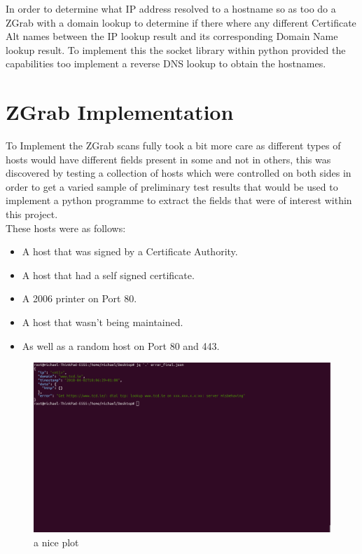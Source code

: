 \documentclass[a4wide,leqno,12pt]{report}
\begin{document}
In order to determine what IP address resolved to a hostname so as too do a ZGrab with a domain lookup to determine if there where any different Certificate Alt names between the IP lookup result and its corresponding Domain Name lookup result. To implement this the socket library within python provided the capabilities too implement a reverse DNS lookup to obtain the hostnames.\\


\section{ZGrab Implementation}
To Implement the ZGrab scans fully took a bit more care as different types of hosts would have different fields present in some and not in others, this was discovered by testing a collection of hosts which were controlled on both sides in order to get a varied sample of preliminary test results that would be used to implement a python programme to extract the fields that were of interest within this project.\\
These hosts were as follows:

\begin{itemize}
  \item A host that was signed by a Certificate Authority.
  \item A host that had a self signed certificate.
  \item A 2006 printer on Port 80.
  \item A host that wasn't being maintained.
  \item As well as a random host on Port 80 and 443.
\end{itemize}
\begin{figure}[H]
\centering
\includegraphics[scale=.3,trim={0 17cm 0 0},clip]{pdf_images/error_zgrab}
\caption{a nice plot}
\label{fig:zgrab_error}
\end{figure}
\end{document}
